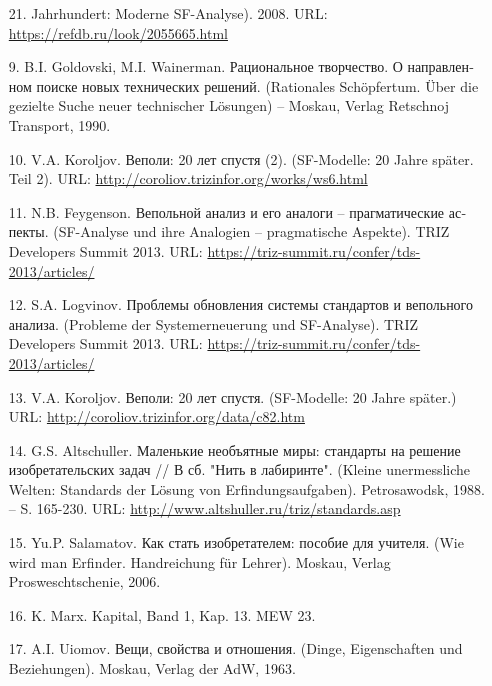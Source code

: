 \documentclass[11pt,a4paper]{article}
\begin{document}
\begin{itemize}
  21. Jahrhundert: Moderne SF-Analyse). 2008. URL:
  \url{https://refdb.ru/look/2055665.html}
\item[9.] B.I. Goldovski, M.I. Wainerman.
  \foreignlanguage{russian}{Рациональное творчество. О направленном поиске
    новых технических решений.} (Rationales Schöpfertum. Über die gezielte
  Suche neuer technischer Lösungen) – Moskau, Verlag Retschnoj Transport,
  1990.
\item[10.] V.A. Koroljov.  \foreignlanguage{russian}{Веполи: 20 лет спустя
  (2)}.  (SF-Modelle: 20 Jahre später. Teil 2).  URL:
  \url{http://coroliov.trizinfor.org/works/ws6.html}
\item[11.] N.B. Feygenson.  \foreignlanguage{russian}{Вепольной анализ и его
  аналоги – прагматические аспекты}. (SF-Analyse und ihre Analogien --
  pragmatische Aspekte).  TRIZ Developers Summit 2013.  URL:
  \url{https://triz-summit.ru/confer/tds-2013/articles/}
\item[12.] S.A. Logvinov. \foreignlanguage{russian}{Проблемы обновления
  системы стандартов и вепольного анализа}. (Probleme der Systemerneuerung und
  SF-Analyse). TRIZ Developers Summit 2013.  URL:
  \url{https://triz-summit.ru/confer/tds-2013/articles/}
\item[13.] V.A. Koroljov. \foreignlanguage{russian}{Веполи: 20 лет спустя}.
  (SF-Modelle: 20 Jahre später.) URL:
  \url{http://coroliov.trizinfor.org/data/c82.htm}
\item[14.] G.S. Altschuller. \foreignlanguage{russian}{Маленькие необъятные
  миры: стандарты на решение изобретательских задач // В сб. "Нить в
  лабиринте".} (Kleine unermessliche Welten: Standards der Lösung von
  Erfindungsaufgaben). Petrosawodsk, 1988. – S. 165-230. URL:
  \url{http://www.altshuller.ru/triz/standards.asp}
\item[15.] Yu.P. Salamatov. \foreignlanguage{russian}{Как стать изобретателем:
  пособие для учителя.} (Wie wird man Erfinder. Handreichung für
  Lehrer). Moskau, Verlag Prosweschtschenie, 2006.
\item[16.] K. Marx. Kapital, Band 1, Kap. 13. MEW 23.
\item[17.] A.I. Uiomov. \foreignlanguage{russian}{Вещи, свойства и отношения.}
  (Dinge, Eigenschaften und Beziehungen). Moskau, Verlag der AdW, 1963.
\end{itemize}
\end{document}
